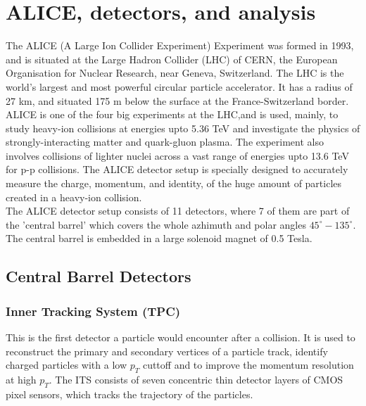 \documentclass[12pt,a4paper,twoside]{report}
\begin{document}
\section{ALICE, detectors, and analysis}
The ALICE (A Large Ion Collider Experiment) Experiment was formed in 1993, and is situated at the Large Hadron Collider (LHC) of CERN, the European Organisation for Nuclear Research, near Geneva, Switzerland. The LHC is the world's largest and most powerful circular particle accelerator. It has a radius of 27 km, and situated 175 m below the surface at the France-Switzerland border.\\
ALICE is one of the four big experiments at the LHC,and is used, mainly, to study heavy-ion collisions at energies upto 5.36 TeV and investigate the physics of strongly-interacting matter and quark-gluon plasma. The experiment also involves collisions of lighter nuclei across a vast range of energies upto 13.6 TeV for p-p collisions. The ALICE detector setup is specially designed to accurately measure the charge, momentum, and identity, of the huge amount of particles created in a heavy-ion collision.\\
The ALICE detector setup consists of 11 detectors, where 7 of them are part of the 'central barrel' which covers the whole azhimuth and polar angles $45^\circ-135^\circ$. The central barrel is embedded in a large solenoid magnet of 0.5 Tesla.\\
\subsection{Central Barrel Detectors}
\subsubsection{Inner Tracking System (TPC)}
This is the first detector a particle would encounter after a collision. It is used to reconstruct the primary and secondary vertices of a particle track, identify charged particles with a low $p_T$ cuttoff and to improve the momentum resolution at high $p_T$. The ITS consists of seven concentric thin detector layers of CMOS pixel sensors, which tracks the trajectory of the particles.
\end{document}

